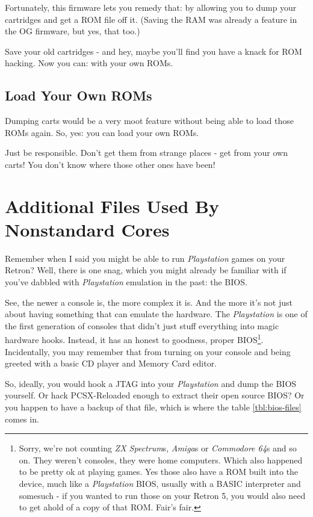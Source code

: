 \documentclass[english]{retronlabo-manual}
\begin{document}
Fortunately, this firmware lets you remedy that: by allowing you to dump your cartridges and get a ROM file off it. (Saving the RAM was already a feature in the OG firmware, but yes, that too.)

Save your old cartridges - and hey, maybe you'll find you have a knack for ROM hacking. Now you can: with your own ROMs.

\subsection{Load Your Own ROMs}

Dumping carts would be a very moot feature without being able to load those ROMs again. So, yes: you can load your own ROMs.

Just be responsible. Don't get them from strange places - get from your own carts! You don't know where those other ones have been!


\section{Additional Files Used By Nonstandard Cores}

Remember when I said you might be able to run \emph{Playstation} games on your Retron? Well, there is one snag, which you might already be familiar with if you've dabbled with \emph{Playstation} emulation in the past: the BIOS.

See, the newer a console is, the more complex it is. And the more it's not just about having something that can emulate the hardware. The \emph{Playstation} is one of the first generation of consoles that didn't just stuff everything into magic hardware hooks. Instead, it has an honest to goodness, proper BIOS\footnote{Sorry, we're not counting \emph{ZX Spectrum}s, \emph{Amiga}s or \emph{Commodore 64}s and so on. They weren't consoles, they were home computers. Which also happened to be pretty ok at playing games. Yes those also have a ROM built into the device, much like a \emph{Playstation} BIOS, usually with a BASIC interpreter and somesuch - if you wanted to run those on your Retron 5, you would also need to get ahold of a copy of that ROM. Fair's fair.}. Incidentally, you may remember that from turning on your console and being greeted with a basic CD player and Memory Card editor.

So, ideally, you would hook a JTAG into your \emph{Playstation} and dump the BIOS yourself. Or hack PCSX-Reloaded enough to extract their open source BIOS? Or you happen to have a backup of that file, which is where the table \ref{tbl:bios-files} comes in.
\end{document}
